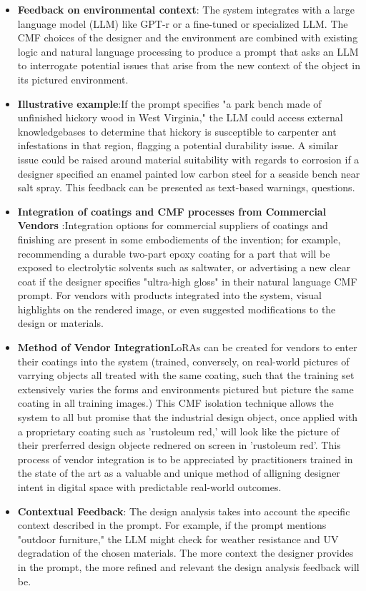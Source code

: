 \documentclass[12pt]{article}
\begin{document}
\begin{itemize}
\item \textbf{Feedback on environmental context}: The system integrates with a large language model (LLM) like GPT-r or a fine-tuned or specialized LLM. The CMF choices of the designer and the environment are combined with existing logic and natural language processing to produce a prompt that asks an LLM to interrogate potential issues that arise from the new context of the object in its pictured environment. 
\item \textbf{Illustrative example}:If the prompt specifies "a park bench made of unfinished hickory wood in West Virginia," the LLM could access external knowledgebases to determine that hickory is susceptible to carpenter ant infestations in that region, flagging a potential durability issue. A similar issue could be raised around material suitability with regards to corrosion if a designer specified an enamel painted low carbon steel for a seaside bench near salt spray. This feedback can be presented as text-based warnings, questions. 
\item \textbf{Integration of coatings and CMF processes from Commercial Vendors }:Integration options for commercial suppliers of coatings and finishing are present in some embodiements of the invention; for example, recommending a durable two-part epoxy coating for a part that will be exposed to electrolytic solvents such as saltwater, or advertising a new clear coat if the designer specifies "ultra-high gloss" in their natural language CMF prompt. For vendors with products integrated into the system, visual highlights on the rendered image, or even suggested modifications to the design or materials. 
\item \textbf{Method of Vendor Integration}LoRAs can be created for vendors to enter their coatings into the system (trained, conversely, on real-world pictures of varrying objects all treated with the same coating, such that the training set extensively varies the forms and environments pictured but picture  the same coating in all training images.) This CMF isolation technique allows the system to all but promise that the industrial design object, once applied with a proprietary coating such as 'rustoleum red,' will look like the picture of their prerferred design objecte rednered on screen in 'rustoleum red'. This process of vendor integration is to be appreciated by practitioners trained in the state of the art as a valuable and unique method of alligning designer intent in digital space with predictable real-world outcomes.

\item \textbf{Contextual Feedback}: The design analysis takes into account the specific context described in the prompt. For example, if the prompt mentions "outdoor furniture," the LLM might check for weather resistance and UV degradation of the chosen materials. The more context the designer provides in the prompt, the more refined and relevant the design analysis feedback will be.
\end{itemize}
\end{document}
